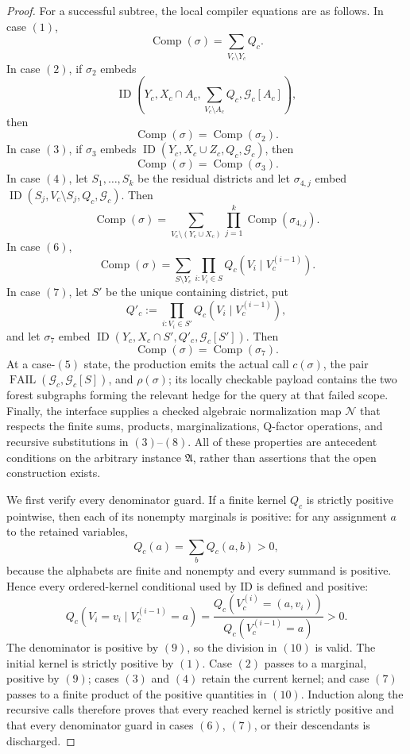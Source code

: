 \documentclass{article}
\begin{document}
\begin{proof}
For a successful subtree, the local compiler equations are as follows.  In case \((1)\),
\[
 \operatorname{Comp}(\sigma)=\sum_{V_c\setminus Y_c}Q_c.
 \tag{3}
\]
In case \((2)\), if \(\sigma_2\) embeds
\[
 \operatorname{ID}\!\left(
 Y_c,X_c\cap A_c,
 \sum_{V_c\setminus A_c}Q_c,
 \mathcal G_c[A_c]
 \right),
\]
then
\[
 \operatorname{Comp}(\sigma)=\operatorname{Comp}(\sigma_2).
 \tag{4}
\]
In case \((3)\), if \(\sigma_3\) embeds
\(\operatorname{ID}(Y_c,X_c\cup Z_c,Q_c,\mathcal G_c)\), then
\[
 \operatorname{Comp}(\sigma)=\operatorname{Comp}(\sigma_3).
 \tag{5}
\]
In case \((4)\), let \(S_1,\ldots,S_k\) be the residual districts and let \(\sigma_{4,j}\) embed
\(\operatorname{ID}(S_j,V_c\setminus S_j,Q_c,\mathcal G_c)\).  Then
\[
 \operatorname{Comp}(\sigma)
 =\sum_{V_c\setminus(Y_c\cup X_c)}
   \prod_{j=1}^{k}\operatorname{Comp}(\sigma_{4,j}).
 \tag{6}
\]
In case \((6)\),
\[
 \operatorname{Comp}(\sigma)
 =\sum_{S\setminus Y_c}
   \prod_{i:V_i\in S}Q_c(V_i\mid V_c^{(i-1)}).
 \tag{7}
\]
In case \((7)\), let \(S'\) be the unique containing district, put
\[
 Q'_c:=\prod_{i:V_i\in S'}Q_c(V_i\mid V_c^{(i-1)}),
\]
and let \(\sigma_7\) embed
\(\operatorname{ID}(Y_c,X_c\cap S',Q'_c,\mathcal G_c[S'])\).  Then
\[
 \operatorname{Comp}(\sigma)=\operatorname{Comp}(\sigma_7).
 \tag{8}
\]
At a case-\((5)\) state, the production emits the actual call \(c(\sigma)\), the pair
\(\operatorname{FAIL}(\mathcal G_c,\mathcal G_c[S])\), and \(\rho(\sigma)\); its locally checkable payload contains the two forest subgraphs forming the relevant hedge for the query at that failed scope.  Finally, the interface supplies a checked algebraic normalization map \(\mathcal N\) that respects the finite sums, products, marginalizations, Q-factor operations, and recursive substitutions in \((3)\)--\((8)\).  All of these properties are antecedent conditions on the arbitrary instance \(\mathfrak A\), rather than assertions that the open construction exists.

We first verify every denominator guard.  If a finite kernel \(Q_c\) is strictly positive pointwise, then each of its nonempty marginals is positive: for any assignment \(a\) to the retained variables,
\[
 Q_c(a)=\sum_b Q_c(a,b)>0,
 \tag{9}
\]
because the alphabets are finite and nonempty and every summand is positive.  Hence every ordered-kernel conditional used by ID is defined and positive:
\[
 Q_c(V_i=v_i\mid V_c^{(i-1)}=a)
 =\frac{Q_c(V_c^{(i)}=(a,v_i))}
 {Q_c(V_c^{(i-1)}=a)}>0.
 \tag{10}
\]
The denominator is positive by \((9)\), so the division in \((10)\) is valid.  The initial kernel is strictly positive by \((1)\).  Case \((2)\) passes to a marginal, positive by \((9)\); cases \((3)\) and \((4)\) retain the current kernel; and case \((7)\) passes to a finite product of the positive quantities in \((10)\).  Induction along the recursive calls therefore proves that every reached kernel is strictly positive and that every denominator guard in cases \((6)\), \((7)\), or their descendants is discharged.


\end{proof}
\end{document}
